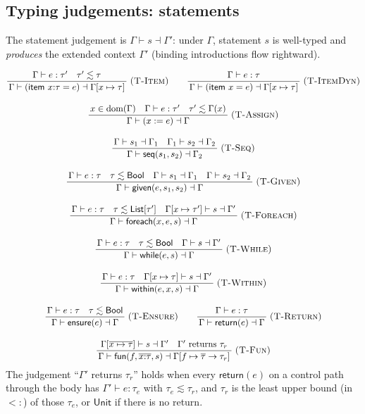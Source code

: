 \documentclass[11pt,a4paper]{article}
\theoremstyle{plain}
\theoremstyle{definition}
\theoremstyle{remark}
\newcommand{\rn}[1]{\textsc{#1}}                          %
\DeclareMathOperator{\dom}{dom}                           %
\newcommand{\subtype}{<:}
\newcommand{\Gam}{\Gamma}
\newcommand{\infrule}[3]{%
  \ensuremath{\displaystyle\frac{\,#2\,}{\,#3\,}}\;\rn{(#1)}}
\newcommand{\jspace}{\qquad}
\begin{document}
\subsection{Typing judgements: statements}

The statement judgement is $\Gam\vdash s\dashv\Gam'$: under $\Gam$, statement
$s$ is well-typed and \emph{produces} the extended context $\Gam'$ (binding
introductions flow rightward).

\begin{gather*}
\infrule{T-Item}{\Gam\vdash e:\tau'\quad \tau'\lesssim\tau}
               {\Gam\vdash (\mathsf{item}\ x{:}\tau = e)\dashv\Gam[x\mapsto\tau]}
\jspace
\infrule{T-ItemDyn}{\Gam\vdash e:\tau}
               {\Gam\vdash (\mathsf{item}\ x = e)\dashv\Gam[x\mapsto\tau]}\\[10pt]
\infrule{T-Assign}{x\in\dom(\Gam)\quad \Gam\vdash e:\tau'\quad
                   \tau'\lesssim\Gam(x)}
                  {\Gam\vdash (x := e)\dashv\Gam}\\[10pt]
\infrule{T-Seq}{\Gam\vdash s_1\dashv\Gam_1 \quad
                \Gam_1\vdash s_2\dashv\Gam_2}
               {\Gam\vdash \mathsf{seq}(s_1,s_2)\dashv\Gam_2}\\[10pt]
\infrule{T-Given}{\Gam\vdash e:\tau\quad\tau\lesssim\mathsf{Bool}\quad
                  \Gam\vdash s_1\dashv\Gam_1\quad\Gam\vdash s_2\dashv\Gam_2}
                 {\Gam\vdash\mathsf{given}(e,s_1,s_2)\dashv\Gam}\\[10pt]
\infrule{T-Foreach}{\Gam\vdash e:\tau\quad\tau\lesssim\mathsf{List}[\tau']\quad
                    \Gam[x\mapsto\tau']\vdash s\dashv\Gam'}
                   {\Gam\vdash\mathsf{foreach}(x,e,s)\dashv\Gam}\\[10pt]
\infrule{T-While}{\Gam\vdash e:\tau\quad\tau\lesssim\mathsf{Bool}\quad
                  \Gam\vdash s\dashv\Gam'}
                 {\Gam\vdash\mathsf{while}(e,s)\dashv\Gam}\\[10pt]
\infrule{T-Within}{\Gam\vdash e:\tau\quad
                   \Gam[x\mapsto\tau]\vdash s\dashv\Gam'}
                  {\Gam\vdash\mathsf{within}(e,x,s)\dashv\Gam}\\[10pt]
\infrule{T-Ensure}{\Gam\vdash e:\tau\quad\tau\lesssim\mathsf{Bool}}
                  {\Gam\vdash\mathsf{ensure}(e)\dashv\Gam}\jspace
\infrule{T-Return}{\Gam\vdash e:\tau}
                  {\Gam\vdash\mathsf{return}(e)\dashv\Gam}\\[10pt]
\infrule{T-Fun}{\Gam[\overline{x\mapsto\tau}]\vdash s\dashv\Gam'\quad
                \Gam'\ \text{returns}\ \tau_r}
               {\Gam\vdash\mathsf{fun}(f,\overline{x{:}\tau},s)\dashv
                \Gam[f\mapsto\overline{\tau}\to\tau_r]}
\end{gather*}
The judgement ``$\Gam'$ returns $\tau_r$'' holds when every $\mathsf{return}(e)$
on a control path through the body has $\Gam'\vdash e:\tau_e$ with
$\tau_e\lesssim\tau_r$, and $\tau_r$ is the least upper bound (in $\subtype$) of
those $\tau_e$, or $\mathsf{Unit}$ if there is no return.
\end{document}
